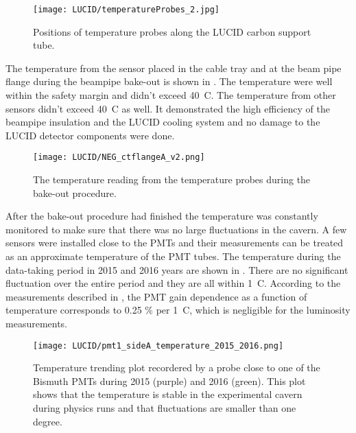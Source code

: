 \begin{figure}
\centering
\texttt{[image: LUCID/temperatureProbes\_2.jpg]}
\caption{Positions of temperature probes along the LUCID carbon support tube.}
\label{fig:temperatureProbes_VJCone}
\end{figure}

The temperature from the sensor placed in the cable tray and at the beam pipe flange during the beampipe bake-out is shown in .
The temperature were well within the safety margin and didn't exceed 40\degree~C. The temperature from other sensors didn't exceed 40\degree~C as well.
It demonstrated the high efficiency of the beampipe insulation and the LUCID cooling system and no damage to the LUCID detector components were done.

\begin{figure}
\centering
\texttt{[image: LUCID/NEG\_ctflangeA\_v2.png]}
\caption{The temperature reading from the temperature probes during the bake-out procedure.}
\label{fig:NEG_ctflangeA}
\end{figure}
 
After the bake-out procedure had finished the temperature was constantly monitored to make sure that there was no large fluctuations in the cavern.
A few sensors were installed close to the PMTs and their measurements can be treated as an approximate temperature of the PMT tubes.
The temperature during the data-taking period in 2015 and 2016 years are shown in . 
There are no significant fluctuation over the entire period and they are all within 1\degree~C.
According to the measurements described in , the PMT gain dependence as a function of temperature corresponds
to 0.25 $\%$ per 1\degree~C, which is negligible for the luminosity measurements.

\begin{figure}
\centering
\texttt{[image: LUCID/pmt1\_sideA\_temperature\_2015\_2016.png]}
\caption{Temperature trending plot recordered by a probe close to one of the Bismuth PMTs
during 2015 (purple) and 2016 (green). This plot shows that the temperature is stable in 
the experimental cavern during physics runs and that fluctuations are smaller than one degree.}
\label{fig:tempTrendingPlot}
\end{figure}

